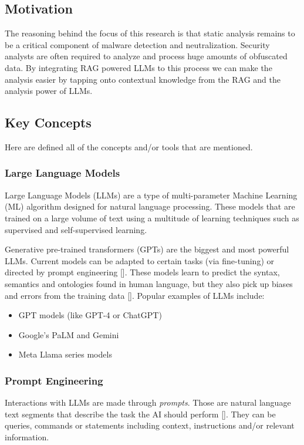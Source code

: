\subsection{Motivation}
The reasoning behind the focus of this research is that static analysis remains to be a critical
component of malware detection and neutralization. Security analysts are often required to analyze
and process huge amounts of obfuscated data. By integrating RAG powered LLMs to this process we can
make the analysis easier by tapping onto contextual knowledge from the RAG and the analysis power
of LLMs.

\subsection{Key Concepts}
Here are defined all of the concepts and/or tools that are mentioned.

\subsubsection{Large Language Models}
Large Language Models (LLMs) are a type of multi-parameter Machine Learning (ML) algorithm designed
for natural language processing. These models that are trained on a large volume of text using a
multitude of learning techniques such as supervised and self-supervised learning.

Generative pre-trained transformers (GPTs) are the biggest and most powerful LLMs. Current models
can be adapted to certain tasks (via fine-tuning) or directed by prompt engineering
	[\cite{brown2020languagemodelsfewshotlearners}]. These models learn to predict the syntax,
semantics and ontologies found in human language, but they also pick up biases and errors from the
training data [\cite{10.1162/daed_a_01905}]. Popular examples of LLMs include:
\begin{itemize}
	\item GPT models (like GPT-4 or ChatGPT)
	\item Google's PaLM and Gemini
	\item Meta Llama series models
\end{itemize}

\subsubsection{Prompt Engineering}
Interactions with LLMs are made through \textit{prompts}. Those are natural language text segments
that describe the task the AI should perform [\cite{radford2019language}]. They can be queries,
commands or statements including context, instructions and/or relevant information.

